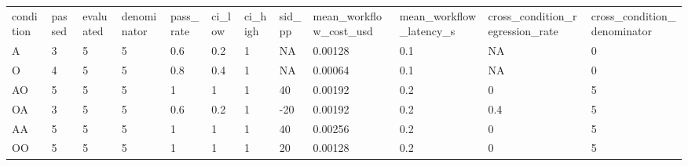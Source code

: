 \begin{tabular}{llllllllllll}
condition & passed & evaluated & denominator & pass\_rate & ci\_low & ci\_high & sid\_pp & mean\_workflow\_cost\_usd & mean\_workflow\_latency\_s & cross\_condition\_regression\_rate & cross\_condition\_denominator \\
A & 3 & 5 & 5 & 0.6 & 0.2 & 1 & NA & 0.00128 & 0.1 & NA & 0 \\
O & 4 & 5 & 5 & 0.8 & 0.4 & 1 & NA & 0.00064 & 0.1 & NA & 0 \\
AO & 5 & 5 & 5 & 1 & 1 & 1 & 40 & 0.00192 & 0.2 & 0 & 5 \\
OA & 3 & 5 & 5 & 0.6 & 0.2 & 1 & -20 & 0.00192 & 0.2 & 0.4 & 5 \\
AA & 5 & 5 & 5 & 1 & 1 & 1 & 40 & 0.00256 & 0.2 & 0 & 5 \\
OO & 5 & 5 & 5 & 1 & 1 & 1 & 20 & 0.00128 & 0.2 & 0 & 5 \\
\end{tabular}
